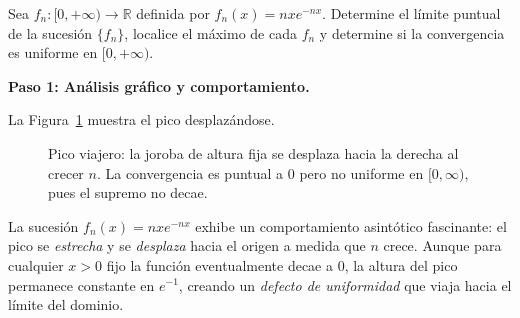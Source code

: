 \begin{example}
Sea $f_n\colon[0,+\infty)\to\mathbb{R}$ definida por $f_n(x)=nxe^{-nx}$.
Determine el límite puntual de la sucesión $\{f_n\}$, localice el
máximo de cada $f_n$ y determine si la convergencia es uniforme
en $[0,+\infty)$.
\begin{myproof}
\textbf{Paso 1: Análisis gráfico y comportamiento.}

La Figura~\ref{fig:ssf_pico_viajero} muestra el pico desplazándose.

\begin{figure}[H]
\centering
{}
\caption{Pico viajero: la joroba de altura fija se desplaza hacia la derecha al crecer $n$. La convergencia es puntual a $0$ pero no uniforme en $[0,\infty)$, pues el supremo no decae.}
\label{fig:ssf_pico_viajero}
\end{figure}

La sucesión $f_n(x) = nxe^{-nx}$ exhibe un comportamiento asintótico
fascinante: el pico se \emph{estrecha} y se \emph{desplaza} hacia el
origen a medida que $n$ crece. Aunque para cualquier $x > 0$ fijo la
función eventualmente decae a $0$, la altura del pico permanece
constante en $e^{-1}$, creando un \emph{defecto de uniformidad}
que viaja hacia el límite del dominio.


\end{myproof}
\end{example}
